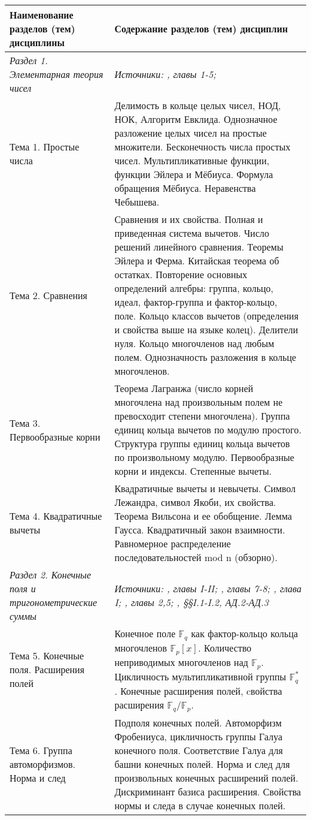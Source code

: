 \documentclass[a4paper, 12pt]{article}
\begin{document}
\noindent
\begin{longtable}{ | >{\raggedright}p{6cm} | p{9cm} | } 
    \hline
    \textbf{Наименование разделов (тем) дисциплины} & \textbf{Содержание разделов (тем) дисциплин} \\
    \hline
    \hline
    \textit{Раздел 1. Элементарная теория чисел} & \textit{Источники: \cite{Vin}, главы 1-5; \cite{IR}} \\ \hline
    Тема 1. Простые числа & Делимость в кольце целых чисел, НОД, НОК, Алгоритм Евклида. Однозначное разложение целых чисел на простые множители. Бесконечность числа простых чисел. Мультипликативные функции, функции Эйлера и Мёбиуса. Формула обращения Мёбиуса. Неравенства Чебышева. \\ \hline
    Тема 2. Сравнения & Сравнения и их свойства. Полная и приведенная система вычетов. Число решений линейного сравнения. Теоремы Эйлера и Ферма. Китайская теорема об остатках. Повторение основных определений алгебры: группа, кольцо, идеал, фактор-группа и фактор-кольцо, поле. Кольцо классов вычетов (определения и свойства выше на языке колец). Делители нуля. Кольцо многочленов над любым полем. Однозначность разложения в кольце многочленов. \\ \hline
    Тема 3. Первообразные корни & Теорема Лагранжа (число корней многочлена над произвольным полем не превосходит степени многочлена). Группа единиц кольца вычетов по модулю простого. Структура группы единиц кольца вычетов по произвольному модулю. Первообразные корни и индексы. Степенные вычеты. \\ \hline
    Тема 4. Квадратичные вычеты & Квадратичные вычеты и невычеты. Символ Лежандра, символ Якоби, их свойства. Теорема Вильсона и ее обобщение. Лемма Гаусса. Квадратичный закон взаимности. Равномерное распределение последовательностей mod n (обзорно). \\ \hline
    \textit{Раздел 2. Конечные поля и тригонометрические суммы} & \textit{Источники: \cite{Step}, главы I-II; \cite{IR}, главы 7-8; \cite{Serre}, глава I; \cite{LN}, главы 2,5; \cite{BSh}, \S\S I.1-I.2, АД.2-АД.3} \\ \hline
    Тема 5. Конечные поля. Расширения полей & Конечное поле $\mathbb{F}_q$ как фактор-кольцо кольца многочленов $\mathbb{F}_p[x]$. Количество неприводимых многочленов над $\mathbb{F}_p$. Цикличность мультипликативной группы $\mathbb{F}_q^*$. Конечные расширения полей, cвойства расширения $\mathbb{F}_q/\mathbb{F}_p$. \\ \hline
    Тема 6. Группа автоморфизмов. Норма и след & Подполя конечных полей. Автоморфизм Фробениуса, цикличность группы Галуа конечного поля. Соответствие Галуа для башни конечных полей. Норма и след для произвольных конечных расширений полей. Дискриминант базиса расширения. Свойства нормы и следа в случае конечных полей.  \\ \hline

\end{longtable}
\end{document}

